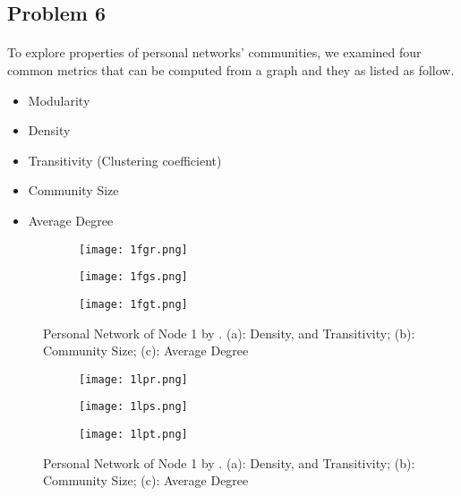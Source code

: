 
\subsection*{Problem 6}
\paragraph{}
To explore properties of personal networks' communities, we examined four common metrics that can be computed from a graph and they as listed as follow.
\begin{itemize}
	\item Modularity
	\item Density
	\item Transitivity (Clustering coefficient)
	\item Community Size
	\item Average Degree
\end{itemize}

\begin{figure}[t]
	\centering
	\begin{subfigure}{.5\textwidth}
		\centering
		\texttt{[image: 1fgr.png]}
		\caption{}		
		\label{fig:1fgr}
	\end{subfigure}%
	\begin{subfigure}{.5\textwidth}
		\centering
		\texttt{[image: 1fgs.png]}
		\caption{}	
		\label{fig:1fgs}
	\end{subfigure}
	\begin{subfigure}{.5\textwidth}
		\centering
		\texttt{[image: 1fgt.png]}
		\caption{}	
		\label{fig:1fgt}
\end{subfigure}
	\caption{Personal Network of Node 1 by . (a): Density, and Transitivity; (b): Community Size; (c): Average Degree}
	\label{fig:1fg}
\end{figure}

\begin{figure}[h!]
	\centering
	\begin{subfigure}{.5\textwidth}
		\centering
		\texttt{[image: 1lpr.png]}
		\caption{}		
		\label{fig:1lpr}
	\end{subfigure}%
	\begin{subfigure}{.5\textwidth}
		\centering
		\texttt{[image: 1lps.png]}
		\caption{}	
		\label{fig:1lps}
	\end{subfigure}
	\begin{subfigure}{.5\textwidth}
		\centering
		\texttt{[image: 1lpt.png]}
		\caption{}	
		\label{fig:1lpt}
	\end{subfigure}
	\caption{Personal Network of Node 1 by . (a): Density, and Transitivity; (b): Community Size; (c): Average Degree}
	\label{fig:1lp}
\end{figure}

